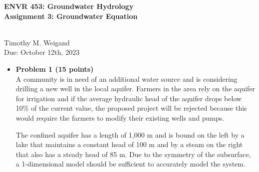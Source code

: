 \documentclass[11pt]{report}
\begin{document}
\begin{center}
\begin{Large}\textbf{ENVR 453: Groundwater Hydrology \\ Assignment 3: Groundwater Equation} \end{Large}
\\ \vspace{0.1cm} Timothy M. Weigand \vspace{0.1cm}\\ 
Due: October 12th, 2023
\end{center}

\vspace{0.2cm}


\begin{itemize}
\item {\bf Problem 1 (15 points) } \\
A community is in need of an additional water source and is considering drilling a new well in the local aquifer. Farmers in the area rely on the aquifer for irrigation and if the average hydraulic head of the aquifer drops below 10\% of the current value, the proposed project will be rejected because this would require the farmers to modify their existing wells and pumps.  

The confined aquifer has a length of 1,000 m and is bound on the left by a lake that maintains a constant head of 100 m and by a steam on the right that also has a steady head of 85 m. 
Due to the symmetry of the subsurface, a 1-dimensional model should be sufficient to accurately model the system. 



\end{itemize}
\end{document}
